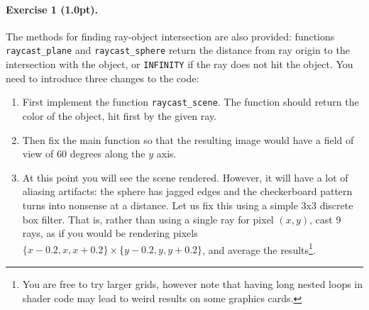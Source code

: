 \documentclass{article}
\newenvironment{exercise}[2]{\paragraph{Exercise #1 (#2pt).} }{
\medskip}
\begin{document}
\begin{exercise}{1}{1.0}
The methods for finding ray-object intersection are also provided: functions \verb#raycast_plane# and \verb#raycast_sphere# return the distance from ray origin to the intersection with the object, or \verb#INFINITY# if the ray does not hit the object. You need to introduce three changes to the code:
\begin{enumerate}
\item First implement the function \verb#raycast_scene#. The function should return the color of the object, hit first by the given ray.
\item Then fix the main function so that the resulting image would have a field of view of 60 degrees along the $y$ axis.
\item At this point you will see the scene rendered. However, it will have a lot of aliasing artifacts: the sphere has jagged edges and the checkerboard pattern turns into nonsense at a distance. Let us fix this using a simple 3x3 discrete box filter. That is, rather than using a single ray for pixel $(x,y)$, cast 9 rays, as if you would be rendering pixels $\{x-0.2, x, x+0.2\}\times\{y-0.2, y, y+0.2\}$, and average the results\footnote{You are free to try larger grids, however note that having long nested loops in shader code may lead to weird results on some graphics cards.}. 
\end{enumerate}
\end{exercise}
\end{document}
